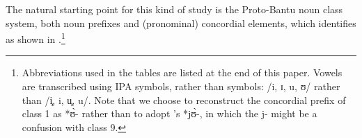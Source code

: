 \documentclass[output=paper,,modfonts,nonflat]{langsci/langscibook}
\begin{document}
The natural starting point for this kind of study is the Proto-Bantu noun class system, both noun prefixes and (pronominal) concordial elements, which  identifies as shown in .\footnote{Abbreviations used in the tables are listed at the end of this paper. Vowels are transcribed using IPA symbols, rather than  symbols: /i, ɪ, u, ʊ/ rather than /i̧, i, u̧, u/. Note that we choose to reconstruct the concordial prefix of class 1 as *ʊ̀- rather than to adopt 's  *jʊ̀-, in which the j- might be a confusion with class 9.}

\end{document}
